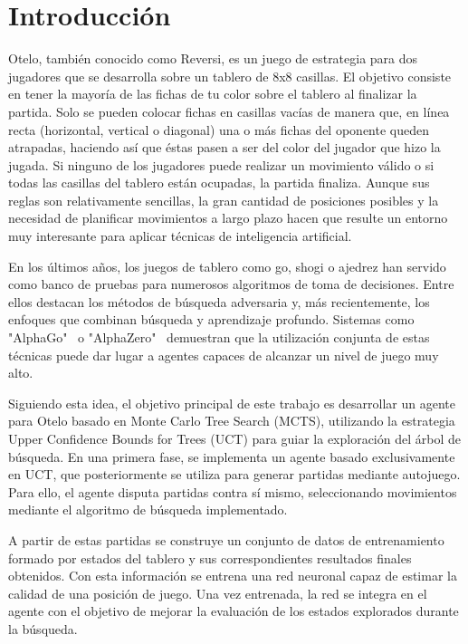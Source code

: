 \documentclass[conference,a4paper]{IEEEtran}
\begin{document}
\section{Introducción} 

Otelo, también conocido como Reversi, es un juego de estrategia para dos jugadores que se desarrolla sobre un tablero de 8x8 casillas. 
El objetivo consiste en tener la mayoría de las fichas de tu color sobre el tablero al finalizar la partida. 
Solo se pueden colocar fichas en casillas vacías de manera que, en línea recta (horizontal, vertical o diagonal) una o más fichas del oponente queden atrapadas, haciendo así que éstas pasen a ser del color del jugador que hizo la jugada. 
Si ninguno de los jugadores puede realizar un movimiento válido o si todas las casillas del tablero están ocupadas, la partida finaliza. 
Aunque sus reglas son relativamente sencillas, la gran cantidad de posiciones posibles y la necesidad de planificar movimientos a largo plazo hacen que resulte un entorno muy interesante para aplicar técnicas de inteligencia artificial. 

En los últimos años, los juegos de tablero como go, shogi o ajedrez han servido como banco de pruebas para numerosos algoritmos de toma de decisiones. 
Entre ellos destacan los métodos de búsqueda adversaria y, más recientemente, los enfoques que combinan búsqueda y aprendizaje profundo. 
Sistemas como "AlphaGo"~\cite{b1} o "AlphaZero"~\cite{b2} demuestran que la utilización conjunta de estas técnicas puede dar lugar a agentes capaces de alcanzar un nivel de juego muy alto. 

Siguiendo esta idea, el objetivo principal de este trabajo es desarrollar un agente para Otelo basado en Monte Carlo Tree Search (MCTS), utilizando la estrategia Upper Confidence Bounds for Trees (UCT) para guiar la exploración del árbol de búsqueda. 
En una primera fase, se implementa un agente basado exclusivamente en UCT, que posteriormente se utiliza para generar partidas mediante autojuego. 
Para ello, el agente disputa partidas contra sí mismo, seleccionando movimientos mediante el algoritmo de búsqueda implementado. 

A partir de estas partidas se construye un conjunto de datos de entrenamiento formado por estados del tablero y sus correspondientes resultados finales obtenidos. 
Con esta información se entrena una red neuronal capaz de estimar la calidad de una posición de juego. 
Una vez entrenada, la red se integra en el agente con el objetivo de mejorar la evaluación de los estados explorados durante la búsqueda. 
\end{document}
